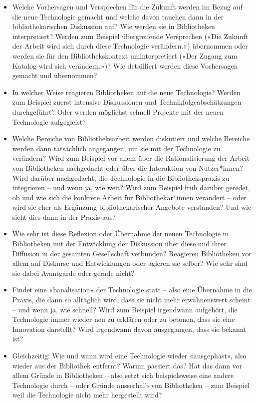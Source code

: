 \documentclass[a4paper,
fontsize=11pt,
oneside,
numbers=noperiodatend,
parskip=half-,
bibliography=totoc,
final
]{scrartcl}
\begin{document}
\begin{itemize}
\item
  Welche Vorhersagen und Versprechen für die Zukunft werden im Bezug auf
  die neue Technologie gemacht und welche davon tauchen dann in der
  bibliothekarischen Diskussion auf? Wie werden sie in Bibliotheken
  interpretiert? Werden zum Beispiel übergreifende Versprechen («Die
  Zukunft der Arbeit wird sich durch diese Technologie verändern.»)
  übernommen oder werden sie für den Bibliothekskontext uminterpretiert
  («Der Zugang zum Katalog wird sich verändern.»)? Wie detailliert
  werden diese Vorhersagen gemacht und übernommen?
\item
  In welcher Weise reagieren Bibliotheken auf die neue Technologie?
  Werden zum Beispiel zuerst intensive Diskussionen und
  Technikfolgeabschätzungen durchgeführt? Oder werden möglichst schnell
  Projekte mit der neuen Technologie aufgegleist?
\item
  Welche Bereiche von Bibliotheksarbeit werden diskutiert und welche
  Bereiche werden dann tatsächlich angegangen, um sie mit der
  Technologie zu verändern? Wird zum Beispiel vor allem über die
  Rationalisierung der Arbeit von Bibliotheken nachgedacht oder über die
  Interaktion von Nutzer*innen? Wird darüber nachgedacht, die
  Technologie in die Bibliothekspraxis zu integrieren -- und wenn ja,
  wie weit? Wird zum Beispiel früh darüber geredet, ob und wie sich die
  konkrete Arbeit für Bibliothekar*innen verändert -- oder wird sie eher
  als Ergänzung bibliothekarischer Angebote verstanden? Und wie sieht
  dies dann in der Praxis aus?
\item
  Wie sehr ist diese Reflexion oder Übernahme der neuen Technologie in
  Bibliotheken mit der Entwicklung der Diskussion über diese und ihrer
  Diffusion in der gesamten Gesellschaft verbunden? Reagieren
  Bibliotheken vor allem auf Diskurse und Entwicklungen oder agieren sie
  selber? Wie sehr sind sie dabei Avantgarde oder gerade nicht?
\item
  Findet eine «banalisation» der Technologie statt -- also eine
  Übernahme in die Praxis, die dann so alltäglich wird, dass sie nicht
  mehr erwähnenswert scheint -- und wenn ja, wie schnell? Wird zum
  Beispiel irgendwann aufgehört, die Technologie immer wieder neu zu
  erklären oder zu betonen, dass sie eine Innovation darstellt? Wird
  irgendwann davon ausgegangen, dass sie bekannt ist?
\item
  Gleichzeitig: Wie und wann wird eine Technologie wieder «ausgephast»,
  also wieder aus der Bibliothek entfernt? Warum passiert das? Hat das
  dann vor allem Gründe in Bibliotheken -- also setzt sich
  beispielsweise eine andere Technologie durch -- oder Gründe ausserhalb
  von Bibliotheken -- zum Beispiel weil die Technologie nicht mehr
  hergestellt wird?
\end{itemize}
\end{document}
